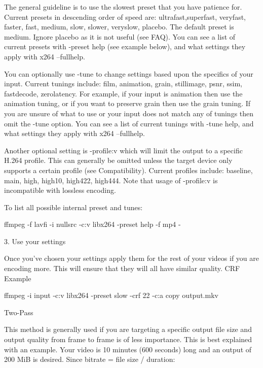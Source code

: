 \begin{itemize}
The general guideline is to use the slowest preset that you have patience for. Current presets in descending order of speed are: ultrafast,superfast, veryfast, faster, fast, medium, slow, slower, veryslow, placebo. The default preset is medium. Ignore placebo as it is not useful (see FAQ). You can see a list of current presets with -preset help (see example below), and what settings they apply with x264 --fullhelp.

You can optionally use -tune to change settings based upon the specifics of your input. Current tunings include: film, animation, grain, stillimage, psnr, ssim, fastdecode, zerolatency. For example, if your input is animation then use the animation tuning, or if you want to preserve grain then use the grain tuning. If you are unsure of what to use or your input does not match any of tunings then omit the -tune option. You can see a list of current tunings with -tune help, and what settings they apply with x264 --fullhelp.

Another optional setting is -profile:v which will limit the output to a specific H.264 profile. This can generally be omitted unless the target device only supports a certain profile (see Compatibility). Current profiles include: baseline, main, high, high10, high422, high444. Note that usage of -profile:v is incompatible with lossless encoding.

To list all possible internal preset and tunes:

\begin{bash}
ffmpeg -f lavfi -i nullsrc -c:v libx264 -preset help -f mp4 -
\end{bash}


3. Use your settings

Once you've chosen your settings apply them for the rest of your videos if you are encoding more. This will ensure that they will all have similar quality.
CRF Example

\begin{bash}
ffmpeg -i input -c:v libx264 -preset slow -crf 22 -c:a copy output.mkv
\end{bash}


Two-Pass

This method is generally used if you are targeting a specific output file size and output quality from frame to frame is of less importance. This is best explained with an example. Your video is 10 minutes (600 seconds) long and an output of 200 MiB is desired. Since bitrate = file size / duration:


\end{itemize}
